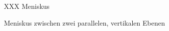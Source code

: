 %
%
%
\begin{figure}
\centering
\vspace{3cm}
XXX Meniskus
\vspace{3cm}
\caption{Meniskus zwischen zwei parallelen, vertikalen Ebenen
\label{buch:nebenbedingungen:transversal:fig:meniskus}}
\end{figure}
